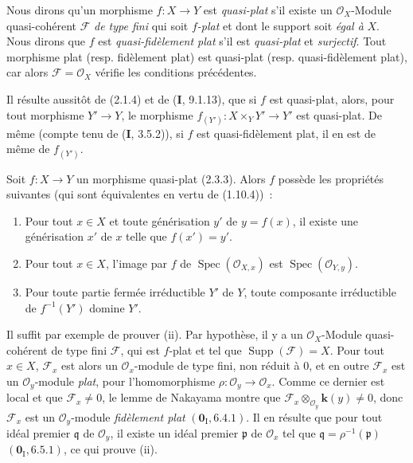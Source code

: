 \begin{env}[2.3.3]
\label{IV.2.3.3-fr}
Nous dirons qu'un morphisme $f:X\to Y$ est \emph{quasi-plat} s'il existe un
$\mathcal O_X$-Module quasi-cohérent $\mathscr F$ \emph{de type fini} qui soit
\emph{$f$-plat} et dont le support soit \emph{égal à} $X$. Nous dirons que $f$ est
\emph{quasi-fidèlement plat} s'il est \emph{quasi-plat} et \emph{surjectif}. Tout morphisme
plat (resp. fidèlement plat) est quasi-plat (resp. quasi-fidèlement plat), car
alors $\mathscr F=\mathcal O_X$ vérifie les conditions précédentes.
\end{env}

Il résulte aussitôt de (2.1.4) et de (\textbf{I}, 9.1.13), que si $f$ est quasi-plat,
alors, pour tout morphisme $Y'\to Y$, le morphisme
$f_{(Y')}:X\times_Y Y'\to Y'$ est quasi-plat. De même (compte tenu de
(\textbf{I}, 3.5.2)), si $f$ est quasi-fidèlement plat, il en est de même de
$f_{(Y')}$.

\begin{proposition}[2.3.4]
Soit $f:X\to Y$ un morphisme quasi-plat \textup{(2.3.3)}. Alors $f$ possède les
propriétés suivantes (qui sont équivalentes en vertu de \textup{(1.10.4)})~:
\begin{enumerate}
  \item[\textup{(i)}] Pour tout $x\in X$ et toute générisation $y'$ de $y=f(x)$, il
  existe une générisation $x'$ de $x$ telle que $f(x')=y'$.
  \item[\textup{(ii)}] Pour tout $x\in X$, l'image par $f$ de
  $\operatorname{Spec}(\mathcal O_{X,x})$ est
  $\operatorname{Spec}(\mathcal O_{Y,y})$.
  \item[\textup{(iii)}] Pour toute partie fermée irréductible $Y'$ de $Y$, toute
  composante irréductible de $f^{-1}(Y')$ domine $Y'$.
\end{enumerate}
\end{proposition}

Il suffit par exemple de prouver (ii). Par hypothèse, il y a un
$\mathcal O_X$-Module quasi-cohérent de type fini $\mathscr F$, qui est
$f$-plat et tel que $\operatorname{Supp}(\mathscr F)=X$. Pour tout $x\in X$,
$\mathscr F_x$ est alors un $\mathcal O_x$-module de type fini, non réduit à
0, et en outre $\mathscr F_x$ est un $\mathcal O_y$-module \emph{plat}, pour
l'homomorphisme $\rho:\mathcal O_y\to\mathcal O_x$. Comme ce dernier est
local et que $\mathscr F_x\neq0$, le lemme de Nakayama montre que
$\mathscr F_x\otimes_{\mathcal O_y}\boldsymbol{k}(y)\neq0$, donc $\mathscr F_x$ est un
$\mathcal O_y$-module \emph{fidèlement plat} $(\mathbf{0}_{\mathrm I},6.4.1)$. Il
en résulte que pour tout idéal premier $\mathfrak q$ de $\mathcal O_y$, il
existe un idéal premier $\mathfrak p$ de $\mathcal O_x$ tel que
$\mathfrak q=\rho^{-1}(\mathfrak p)$ $(\mathbf{0}_{\mathrm I},6.5.1)$, ce qui
prouve (ii).

